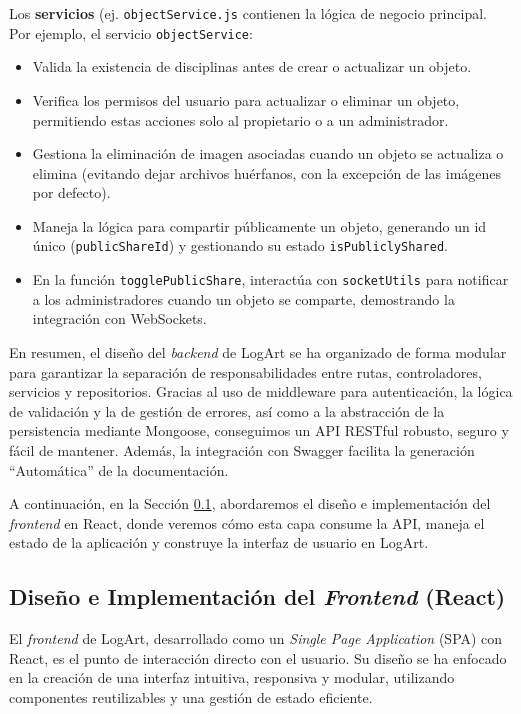 Los \textbf{servicios} (ej. \texttt{objectService.js} contienen la lógica de negocio principal. Por ejemplo, el servicio \texttt{objectService}:
\begin{itemize}
    \item Valida la existencia de disciplinas antes de crear o actualizar un objeto.
    \item Verifica los permisos del usuario para actualizar o eliminar un objeto, permitiendo estas acciones solo al propietario o a un administrador.
    \item Gestiona la eliminación de imagen asociadas cuando un objeto se actualiza o elimina (evitando dejar archivos huérfanos, con la excepción de las imágenes por defecto).
    \item Maneja la lógica para compartir públicamente un objeto, generando un id único (\texttt{publicShareId}) y gestionando su estado \texttt{isPubliclyShared}.
    \item En la función \texttt{togglePublicShare}, interactúa con \texttt{socketUtils} para notificar a los administradores cuando un objeto se comparte, demostrando la integración con WebSockets.
\end{itemize}

En resumen, el diseño del \textit{backend} de LogArt se ha organizado de forma modular para garantizar la separación de responsabilidades entre rutas, controladores, servicios y repositorios. Gracias al uso de middleware para autenticación, la lógica de validación y la de gestión de errores, así como a la abstracción de la persistencia mediante Mongoose, conseguimos un API RESTful robusto, seguro y fácil de mantener. Además, la integración con Swagger facilita la generación ``Automática'' de la documentación.

A continuación, en la Sección \ref{ssec:disenoImplFrontend}, abordaremos el diseño e implementación del \textit{frontend} en React, donde veremos cómo esta capa consume la API, maneja el estado de la aplicación y construye la interfaz de usuario en LogArt.

\subsection{Diseño e Implementación del \textit{Frontend} (React)}
\label{ssec:disenoImplFrontend}

El \textit{frontend} de LogArt, desarrollado como un \textit{Single Page Application} (SPA) con React, es el punto de interacción directo con el usuario. Su diseño se ha enfocado en la creación de una interfaz intuitiva, responsiva y modular, utilizando componentes reutilizables y una gestión de estado eficiente.

